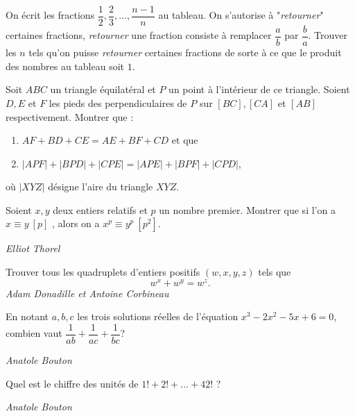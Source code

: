\begin{exo}{}
On écrit les fractions $\dfrac{1}{2},\dfrac{2}{3},...,\dfrac{n-1}{n}$ au tableau. On s'autorise à "\textit{retourner}" certaines fractions, \textit{retourner} une fraction consiste à remplacer $\dfrac{a}{b}$ par $\dfrac{b}{a}$. Trouver les $n$ tels qu'on puisse \textit{retourner} certaines fractions de sorte à ce que le produit des nombres au tableau soit $1$.
\end{exo}


\begin{exo}{}
Soit $ABC$ un triangle équilatéral et $P$ un point à l'intérieur de ce triangle. Soient $D,E$ et $F$ les pieds des perpendiculaires de $P$ sur $[BC],[CA]$ et $[AB]$ respectivement. Montrer que :
\begin{enumerate}
\item $AF+BD+CE=AE+BF+CD$ et que
\item $|APF|+|BPD|+|CPE|=|APE|+|BPF|+|CPD|$,
\end{enumerate}
où $|XYZ|$ désigne l'aire du triangle $XYZ$.
\end{exo}

\begin{exo}{}
Soient $x,y$ deux entiers relatifs et $p$ un nombre premier. Montrer que si l'on a $x\equiv y \ [p]$ , alors on a $x^p\equiv y^p \ [p^2]$.

\medskip
\textit{Elliot Thorel}
\end{exo}

\begin{exo}{}
Trouver tous les quadruplets d'entiers positifs $(w,x,y,z)$ tels que
$$w^x+w^y=w^z.$$
\medskip
\textit{Adam Donadille et Antoine Corbineau}

\end{exo}

\begin{exo}{}
En notant $a,b,c$ les trois solutions réelles de l'équation $x^3-2x^2-5x+6=0$, combien vaut $\dfrac{1}{ab}+\dfrac{1}{ac}+\dfrac{1}{bc}$?

\medskip
\textit{Anatole Bouton}
\end{exo}




\begin{exo}{}
Quel est le chiffre des unités de $1!+2!+...+42!$ ?

\medskip
\textit{Anatole Bouton}
\end{exo}


